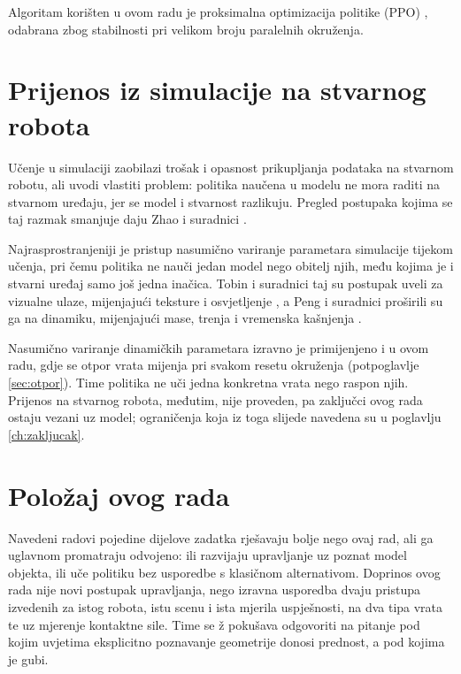 Algoritam korišten u ovom radu je proksimalna optimizacija politike (PPO) \cite{schulman2017ppo},
odabrana zbog stabilnosti pri velikom broju paralelnih okruženja.

\section{Prijenos iz simulacije na stvarnog robota}
\label{sec:pregled-sim2real}

Učenje u simulaciji zaobilazi trošak i opasnost prikupljanja podataka na stvarnom robotu, ali
uvodi vlastiti problem: politika naučena u modelu ne mora raditi na stvarnom uređaju, jer se
model i stvarnost razlikuju. Pregled postupaka kojima se taj razmak smanjuje daju Zhao i
suradnici \cite{zhao2020sim2real}.

Najrasprostranjeniji je pristup nasumično variranje parametara simulacije tijekom učenja, pri
čemu politika ne nauči jedan model nego obitelj njih, među kojima je i stvarni uređaj samo još
jedna inačica. Tobin i suradnici taj su postupak uveli za vizualne ulaze, mijenjajući teksture i
osvjetljenje \cite{tobin2017domain}, a Peng i suradnici proširili su ga na dinamiku, mijenjajući
mase, trenja i vremenska kašnjenja \cite{peng2018dynamics}.

Nasumično variranje dinamičkih parametara izravno je primijenjeno i u ovom radu, gdje se otpor
vrata mijenja pri svakom resetu okruženja (potpoglavlje \ref{sec:otpor}). Time politika
ne uči jedna konkretna vrata nego raspon njih. Prijenos na stvarnog robota, međutim, nije
proveden, pa zaključci ovog rada ostaju vezani uz model; ograničenja koja iz toga slijede
navedena su u poglavlju \ref{ch:zakljucak}.

\section{Položaj ovog rada}
\label{sec:pregled-pozicija}

Navedeni radovi pojedine dijelove zadatka rješavaju bolje nego ovaj rad, ali ga uglavnom
promatraju odvojeno: ili razvijaju upravljanje uz poznat model objekta, ili uče politiku bez
usporedbe s klasičnom alternativom. Doprinos ovog rada nije novi postupak upravljanja, nego
izravna usporedba dvaju pristupa izvedenih za istog robota, istu scenu i ista mjerila
uspješnosti, na dva tipa vrata te uz mjerenje kontaktne sile. Time se ž pokušava odgovoriti
na pitanje pod kojim uvjetima eksplicitno poznavanje geometrije donosi prednost, a pod kojima je gubi.